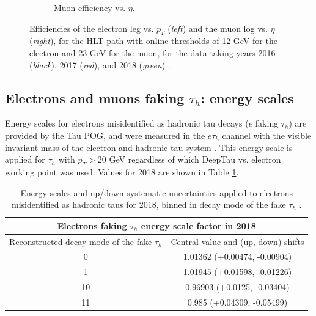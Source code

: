 \begin{figure}[h]
\begin{subfigure}{0.45\textwidth}
        \caption{Muon efficiency vs. $\eta$.}
        \label{fig:muon_efficiency_vs_eta_emu}
    \end{subfigure}
    \caption[Efficiencies of the electron leg vs. $p_{T}$ (\textit{left}) and the muon log vs. $\eta$ (\textit{right}), for the HLT path with online thresholds of 12 GeV for the electron and 23 GeV for the muon, with the data-taking years 2016 through 2018 overlaid.]{Efficiencies of the electron leg vs. $p_{T}$ (\textit{left}) and the muon log vs. $\eta$ (\textit{right}), for the HLT path with online thresholds of 12 GeV for the electron and 23 GeV for the muon, for the data-taking years 2016 (\textit{black}), 2017 (\textit{red}), and 2018 (\textit{green}) \cite{CMS-DP-2019-025}.} 
\end{figure}


\subsection{Electrons and muons faking \texorpdfstring{$\tau_{h}$}{tauh}: energy scales}

Energy scales for electrons misidentified as hadronic tau decays ($e$ faking $\tau_{h}$) are provided by the Tau POG, and were measured in the $e\tau_{h}$ channel with the visible invariant mass of the electron and hadronic tau system \cite{twiki_HiggsToTauTauWorkingLegacyRun2}. This energy scale is applied for $\tau_{h}$ with $p_{T} > 20$ GeV regardless of which DeepTau vs. electron working point was used. Values for 2018 are shown in Table \ref{table:electron-faking-tauh-FES-2018}.

\begin{table}[h]
    \centering
    \begin{tabular}{|c|c|}
    \hline
    \multicolumn{2}{|c|}{Electrons faking $\tau_{h}$ energy scale factor in 2018}      \\ \hline
    \hline
    Reconstructed decay mode of the fake $\tau_{h}$  & Central value and (up, down) shifts \\ \hline
    0   & 1.01362 (+0.00474, -0.00904) \\
    1   & 1.01945 (+0.01598, -0.01226) \\
    10  & 0.96903 (+0.0125, -0.03404) \\
    11 & 0.985 (+0.04309, -0.05499) \\ \hline
    \end{tabular}
    \caption[Energy scales and up/down systematic uncertainties applied to electrons misidentified as hadronic taus.]{Energy scales and up/down systematic uncertainties applied to electrons misidentified as hadronic taus for 2018, binned in decay mode of the fake $\tau_{h}$ \cite{twiki_HiggsToTauTauWorkingLegacyRun2}.}
    \label{table:electron-faking-tauh-FES-2018}
\end{table}


